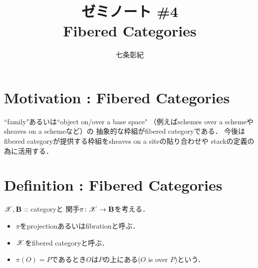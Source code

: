 \documentclass[a4paper, dvipdfmx]{jsarticle}
\begin{document}
\title{ゼミノート \#4 \\ Fibered Categories}
\author{七条彰紀}
\maketitle

\section{Motivation : Fibered Categories}
    ``family"あるいは``object on/over a base space"
    （例えばschemes over a schemeやsheaves on a schemeなど）の
    抽象的な枠組がfibered categoryである．
    今後はfibered categoryが提供する枠組をsheaves on a siteの貼り合わせや
    stackの定義の為に活用する．

\section{Definition : Fibered Categories}
    $\mathscr{X}, \mathbf{B}$ :: categoryと
    関手$\pi \colon \mathscr{X} \to \mathbf{B}$を考える．
    \begin{itemize}
    \item 
        $\pi$をprojectionあるいはfibrationと呼ぶ．
    \item
        $\mathscr{X}$をfibered categoryと呼ぶ．
    \item
        $\pi(O)=P$であるとき$O$は$P$の上にある($O$ is over $P$)という．
    \end{itemize}
\end{document}
